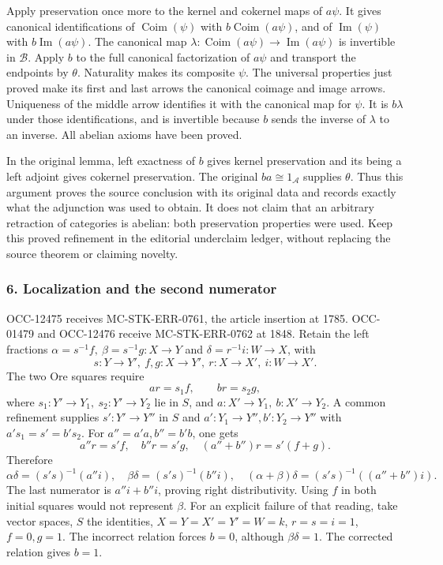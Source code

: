 Apply preservation once more to the kernel and cokernel maps of \(a\psi\). It gives canonical identifications of \(\operatorname{Coim}(\psi)\) with \(b\operatorname{Coim}(a\psi)\), and of \(\operatorname{Im}(\psi)\) with \(b\operatorname{Im}(a\psi)\). The canonical map \(\lambda:\operatorname{Coim}(a\psi)\to\operatorname{Im}(a\psi)\) is invertible in \(\mathcal B\). Apply \(b\) to the full canonical factorization of \(a\psi\) and transport the endpoints by \(\theta\). Naturality makes its composite \(\psi\). The universal properties just proved make its first and last arrows the canonical coimage and image arrows. Uniqueness of the middle arrow identifies it with the canonical map for \(\psi\). It is \(b\lambda\) under those identifications, and is invertible because \(b\) sends the inverse of \(\lambda\) to an inverse. All abelian axioms have been proved.

In the original lemma, left exactness of \(b\) gives kernel preservation and its being a left adjoint gives cokernel preservation. The original \(ba\cong1_{\mathcal A}\) supplies \(\theta\). Thus this argument proves the source conclusion with its original data and records exactly what the adjunction was used to obtain. It does not claim that an arbitrary retraction of categories is abelian: both preservation properties were used. Keep this proved refinement in the editorial underclaim ledger, without replacing the source theorem or claiming novelty.

\subsubsection{6. Localization and the second numerator}\label{localization-and-the-second-numerator}

OCC-12475 receives MC-STK-ERR-0761, the article insertion at 1785. OCC-01479 and OCC-12476 receive MC-STK-ERR-0762 at 1848. Retain the left fractions \(\alpha=s^{-1}f,\ \beta=s^{-1}g:X\to Y\) and \(\delta=r^{-1}i:W\to X\), with \[
s:Y\to Y',\ f,g:X\to Y',\
r:X\to X',\ i:W\to X'.
\] The two Ore squares require \[
ar=s_1f,\qquad br=s_2g,
\] where \(s_1:Y'\to Y_1,\ s_2:Y'\to Y_2\) lie in \(S\), and \(a:X'\to Y_1,\ b:X'\to Y_2\). A common refinement supplies \(s':Y'\to Y''\) in \(S\) and \(a':Y_1\to Y'',b':Y_2\to Y''\) with \(a's_1=s'=b's_2\). For \(a''=a'a,b''=b'b\), one gets \[
a''r=s'f,\quad b''r=s'g,\quad (a''+b'')r=s'(f+g).
\] Therefore \[
\alpha\delta=(s's)^{-1}(a''i),\quad
\beta\delta=(s's)^{-1}(b''i),\quad
(\alpha+\beta)\delta=(s's)^{-1}((a''+b'')i).
\] The last numerator is \(a''i+b''i\), proving right distributivity. Using \(f\) in both initial squares would not represent \(\beta\). For an explicit failure of that reading, take vector spaces, \(S\) the identities, \(X=Y=X'=Y'=W=k\), \(r=s=i=1\), \(f=0,g=1\). The incorrect relation forces \(b=0\), although \(\beta\delta=1\). The corrected relation gives \(b=1\).

